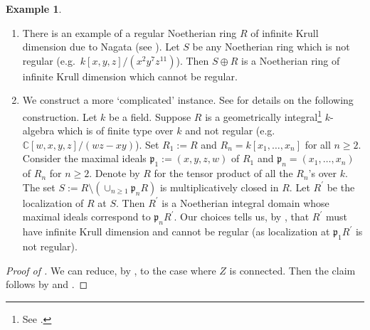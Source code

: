 \documentclass[11pt]{amsart}
\theoremstyle{plain}
\theoremstyle{definition}
\newtheorem{example}[theorem]{Example}
\numberwithin{equation}{section}
\numberwithin{theorem}{section}
\begin{document}
\begin{example}\label{ex:nagata_singular}
    \hfill
    \begin{enumerate}
        \item There is an example of a regular Noetherian ring $R$ of infinite Krull dimension due to Nagata (see \cite[Example 1]{Nagata:1962}). Let $S$ be any Noetherian ring which is not regular (e.g.\ $k[ x,y,z ] / (x^2 y^7 z^{11})$). Then $S\oplus R$ is a Noetherian ring of infinite Krull dimension which cannot be regular.
        \item We construct a more `complicated' instance. See \cite[Proposition 1]{Hochster:1973} for details on the following construction. Let $k$ be a field. Suppose $R$ is a geometrically integral\footnote{See \cite[\href{https://stacks.math.columbia.edu/tag/05DW}{Tag 05DW}]{StacksProject}.} $k$-algebra which is of finite type over $k$ and not regular (e.g.\ $\mathbb{C}[w,x,y,z]/(wz-xy)$). Set $R_1:=R$ and $R_n = k[x_1,\ldots,x_n]$ for all $n\geq 2$. Consider the maximal ideals $\mathfrak{p}_1:=(x,y,z,w)$ of $R_1$ and $\mathfrak{p}_n = (x_1,\ldots,x_n)$ of $R_n$ for $n\geq 2$. Denote by $R$ for the tensor product of all the $R_n$'s over $k$. The set $S:=R\setminus (\cup_{n\geq 1} \mathfrak{p}_n R)$ is multiplicatively closed in $R$. Let $R^\prime$ be the localization of $R$ at $S$. Then $R^\prime$ is a Noetherian integral domain whose maximal ideals correspond to $\mathfrak{p}_n R^\prime$. Our choices tells us, by \cite[Proposition 1]{Hochster:1973}, that $R^\prime$ must have infinite Krull dimension and cannot be regular (as localization at $\mathfrak{p}_1 R^\prime$ is not regular). 
    \end{enumerate}
\end{example}

\begin{proof}
    [Proof of ]
    We can reduce, by , to the case where $Z$ is connected. Then the claim follows by 
    and .
\end{proof}



\end{document}
